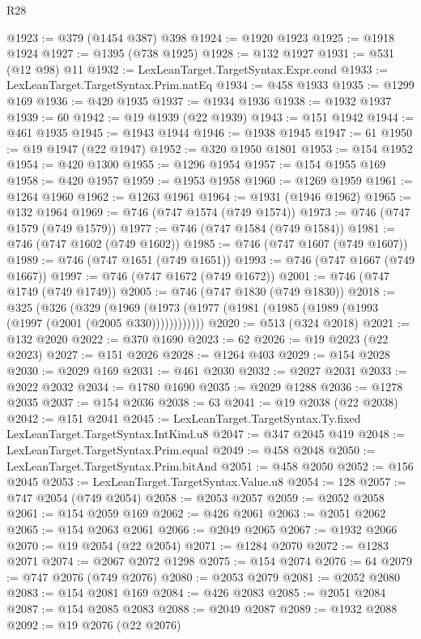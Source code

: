 \begin{lexlean}{R28}
\begin{coremodule}
@1923 := @379 (@1454 @387) @398
@1924 := @1920 @1923
@1925 := @1918 @1924
@1927 := @1395 (@738 @1925)
@1928 := @132 @1927
@1931 := @531 (@12 @98) @11
@1932 := LexLeanTarget.TargetSyntax.Expr.cond
@1933 := LexLeanTarget.TargetSyntax.Prim.natEq
@1934 := @458 @1933
@1935 := @1299 @169
@1936 := @420 @1935
@1937 := @1934 @1936
@1938 := @1932 @1937
@1939 := 60
@1942 := @19 @1939 (@22 @1939)
@1943 := @151 @1942
@1944 := @461 @1935
@1945 := @1943 @1944
@1946 := @1938 @1945
@1947 := 61
@1950 := @19 @1947 (@22 @1947)
@1952 := @320 @1950 @1801
@1953 := @154 @1952
@1954 := @420 @1300
@1955 := @1296 @1954
@1957 := @154 @1955 @169
@1958 := @420 @1957
@1959 := @1953 @1958
@1960 := @1269 @1959
@1961 := @1264 @1960
@1962 := @1263 @1961
@1964 := @1931 (@1946 @1962)
@1965 := @132 @1964
@1969 := @746 (@747 @1574 (@749 @1574))
@1973 := @746 (@747 @1579 (@749 @1579))
@1977 := @746 (@747 @1584 (@749 @1584))
@1981 := @746 (@747 @1602 (@749 @1602))
@1985 := @746 (@747 @1607 (@749 @1607))
@1989 := @746 (@747 @1651 (@749 @1651))
@1993 := @746 (@747 @1667 (@749 @1667))
@1997 := @746 (@747 @1672 (@749 @1672))
@2001 := @746 (@747 @1749 (@749 @1749))
@2005 := @746 (@747 @1830 (@749 @1830))
@2018 := @325
    (@326
      (@329 (@1969 (@1973 (@1977 (@1981 (@1985 (@1989 (@1993 (@1997 (@2001 (@2005 @330))))))))))))
@2020 := @513 (@324 @2018)
@2021 := @132 @2020
@2022 := @370 @1690
@2023 := 62
@2026 := @19 @2023 (@22 @2023)
@2027 := @151 @2026
@2028 := @1264 @403
@2029 := @154 @2028
@2030 := @2029 @169
@2031 := @461 @2030
@2032 := @2027 @2031
@2033 := @2022 @2032
@2034 := @1780 @1690
@2035 := @2029 @1288
@2036 := @1278 @2035
@2037 := @154 @2036
@2038 := 63
@2041 := @19 @2038 (@22 @2038)
@2042 := @151 @2041
@2045 := LexLeanTarget.TargetSyntax.Ty.fixed LexLeanTarget.TargetSyntax.IntKind.u8
@2047 := @347 @2045 @419
@2048 := LexLeanTarget.TargetSyntax.Prim.equal
@2049 := @458 @2048
@2050 := LexLeanTarget.TargetSyntax.Prim.bitAnd
@2051 := @458 @2050
@2052 := @156 @2045
@2053 := LexLeanTarget.TargetSyntax.Value.u8
@2054 := 128
@2057 := @747 @2054 (@749 @2054)
@2058 := @2053 @2057
@2059 := @2052 @2058
@2061 := @154 @2059 @169
@2062 := @426 @2061
@2063 := @2051 @2062
@2065 := @154 @2063 @2061
@2066 := @2049 @2065
@2067 := @1932 @2066
@2070 := @19 @2054 (@22 @2054)
@2071 := @1284 @2070
@2072 := @1283 @2071
@2074 := @2067 @2072 @1298
@2075 := @154 @2074
@2076 := 64
@2079 := @747 @2076 (@749 @2076)
@2080 := @2053 @2079
@2081 := @2052 @2080
@2083 := @154 @2081 @169
@2084 := @426 @2083
@2085 := @2051 @2084
@2087 := @154 @2085 @2083
@2088 := @2049 @2087
@2089 := @1932 @2088
@2092 := @19 @2076 (@22 @2076)

\end{coremodule}
\end{lexlean}
